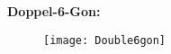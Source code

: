 \documentclass{beamer}
\begin{document}
\begin{frame}
\textbf{Doppel-6-Gon:}
\begin{figure}[H]
\begin{center}
\texttt{[image: Double6gon]}
\end{center}
\end{figure}
\end{frame}
\begin{comment}
\begin{frame}
\textbf{Ausschnitt einer Sphäre}:
\begin{figure}[H]
\begin{center}
\texttt{[image: facgraKan]}
\end{center}
\end{figure}
\end{frame}

\begin{frame}
\textbf{Ausschnitt einer Sphäre}:
\begin{figure}[H]
\begin{center}
\texttt{[image: fgVortrag]}
\end{center}
\end{figure}
\end{frame}
\begin{frame}{Beispiel}

\begin{columns}
    \column{0.5\textwidth}
   \texttt{[image: facgraKan]}\\
    \column{0.5\textwidth}

\texttt{[image: Image\_fg8]}\\
\end{columns}
\end{frame}

\begin{frame}{Beispiel}

\begin{columns}
    \column{0.5\textwidth}
   \texttt{[image: fgvortrag1]}\\
    \column{0.5\textwidth}


\end{comment}
\end{document}
